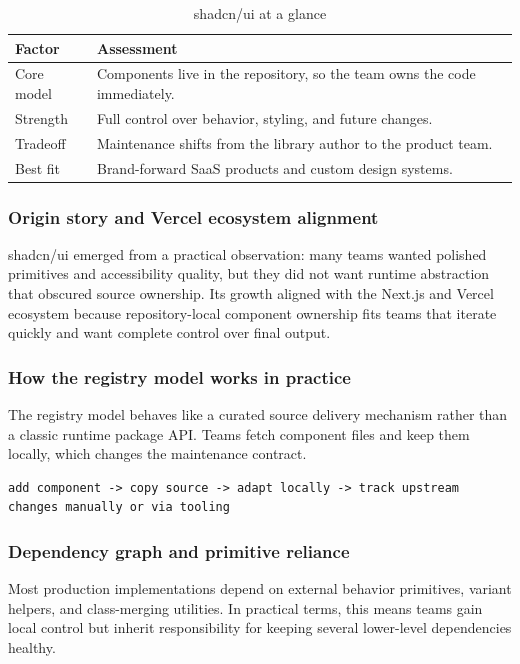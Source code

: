 \documentclass[11pt,twoside,a4paper]{article}
\begin{document}
\begin{table}[htbp]
  \centering
  \caption{shadcn/ui at a glance}
  \begin{tabularx}{\textwidth}{@{}p{}Y@{}}
    \toprule
    \textbf{Factor} & \textbf{Assessment} \\
    \midrule
    Core model & Components live in the repository, so the team owns the code immediately. \\
    Strength & Full control over behavior, styling, and future changes. \\
    Tradeoff & Maintenance shifts from the library author to the product team. \\
    Best fit & Brand-forward SaaS products and custom design systems. \\
    \bottomrule
  \end{tabularx}
\end{table}

\subsubsection{Origin story and Vercel ecosystem alignment}
shadcn/ui emerged from a practical observation: many teams wanted polished primitives and accessibility quality, but they did not want runtime abstraction that obscured source ownership. Its growth aligned with the Next.js and Vercel ecosystem because repository-local component ownership fits teams that iterate quickly and want complete control over final output.

\subsubsection{How the registry model works in practice}
The registry model behaves like a curated source delivery mechanism rather than a classic runtime package API. Teams fetch component files and keep them locally, which changes the maintenance contract.

\begin{verbatim}
add component -> copy source -> adapt locally -> track upstream changes manually or via tooling
\end{verbatim}

\subsubsection{Dependency graph and primitive reliance}
Most production implementations depend on external behavior primitives, variant helpers, and class-merging utilities. In practical terms, this means teams gain local control but inherit responsibility for keeping several lower-level dependencies healthy.
\end{document}
